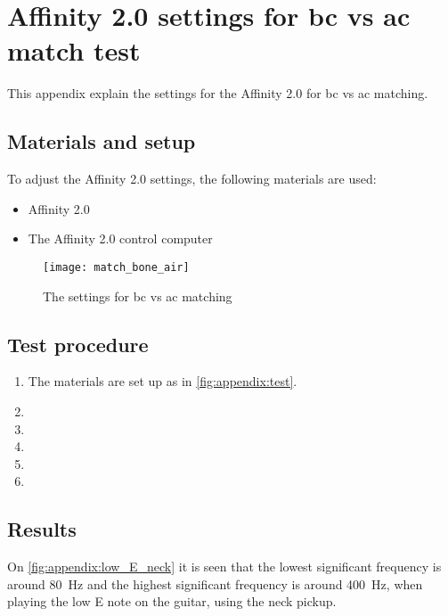 \chapter*{Affinity 2.0 settings for \gls{bc} vs \gls{ac} match test}
This appendix explain the settings for the Affinity 2.0 for \gls{bc} vs \gls{ac} matching.

\section*{Materials and setup}
To adjust the Affinity 2.0 settings, the following materials are used:
\begin{itemize}
\item Affinity 2.0
\item The Affinity 2.0 control computer
\end{itemize}

\begin{figure}[H]
	\centering
		\texttt{[image: match\_bone\_air]}
		\caption{The settings for  \gls{bc} vs \gls{ac} matching}
		\label{fig:apend_match_bone_air}
\end{figure}

\section*{Test procedure}


\begin{enumerate}
\item The materials are set up as in \autoref{fig:appendix:test}.
\item 
\item  
\item  
\item 
\item 
\end{enumerate}

\section*{Results}



On  \autoref{fig:appendix:low_E_neck} it is seen that the lowest significant frequency is around \SI{80}{\hertz} and the highest significant frequency is around \SI{400}{\hertz}, when playing the low E note on the guitar, using the neck pickup.
